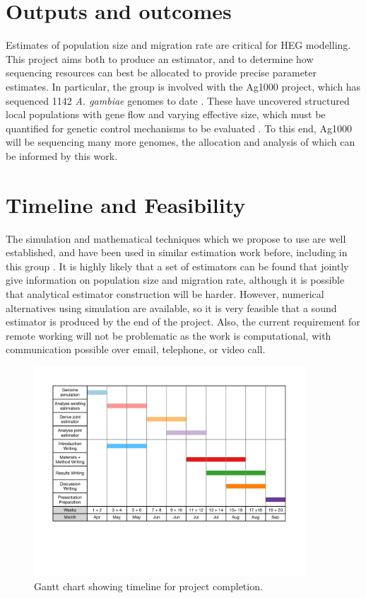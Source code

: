 \documentclass[11pt, a4paper]{article}
\begin{document}
\begin{linenumbers}
\section*{Outputs and outcomes}
\noindent Estimates of population size and migration rate are critical for HEG modelling. This project aims both to produce an estimator, and to determine how sequencing resources can best be allocated to provide precise parameter estimates. In particular, the group is involved with the Ag1000 project, which has sequenced 1142 \textit{A. gambiae} genomes to date \cite{ag1000preprint}. These have uncovered structured local populations with gene flow and varying effective size, which must be quantified for genetic control mechanisms to be evaluated \cite{ag1000preprint}. To this end, Ag1000 will be sequencing many more genomes, the allocation and analysis of which can be informed by this work. 

\section*{Timeline and Feasibility}
\noindent The simulation and mathematical techniques which we propose to use are well established, and have been used in similar estimation work before, including in this group \cite{Hui}. It is highly likely that a set of estimators can be found that jointly give information on population size and migration rate, although it is possible that analytical estimator construction will be harder. However, numerical alternatives using simulation are available, so it is very feasible that a sound estimator is produced by the end of the project. 
Also, the current requirement for remote working will not be problematic as the work is computational, with communication possible over email, telephone, or video call. 
        \begin{figure}[H]
        \centering
        \includegraphics[width=4in]{Gantt.pdf}
        \caption{ Gantt chart showing timeline for project completion.}
        \label{fig:gannt}
        \end{figure}

\end{linenumbers}
\end{document}
